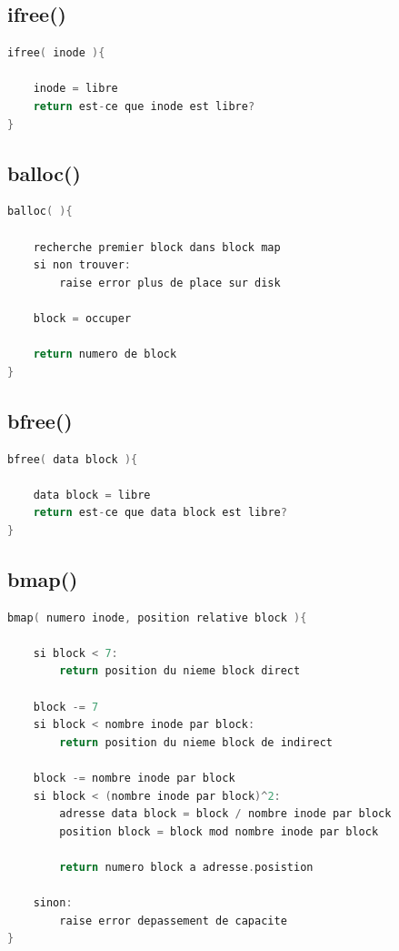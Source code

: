 \documentclass[a4paper,12pt]{article}
\begin{document}
\subsection{ifree()}

\begin{lstlisting}[language=C, caption=pseudo code ifree()()]
ifree( inode ){

	inode = libre
	return est-ce que inode est libre?
}
\end{lstlisting}

\subsection{balloc()}

\begin{lstlisting}[language=C, caption=pseudo code balloc()()]
balloc( ){

	recherche premier block dans block map
	si non trouver:
		raise error plus de place sur disk
	
	block = occuper

	return numero de block
}
\end{lstlisting}

\subsection{bfree()}

\begin{lstlisting}[language=C, caption=pseudo code bfree()()]
bfree( data block ){

	data block = libre
	return est-ce que data block est libre?
}
\end{lstlisting}

\subsection{bmap()}

\begin{lstlisting}[language=C, caption=pseudo code bmap()()]
bmap( numero inode, position relative block ){

	si block < 7:
		return position du nieme block direct
		
	block -= 7
	si block < nombre inode par block:
		return position du nieme block de indirect
	
	block -= nombre inode par block
	si block < (nombre inode par block)^2:
		adresse	data block = block / nombre inode par block
		position block = block mod nombre inode par block
		
		return numero block a adresse.posistion
		
	sinon:
		raise error depassement de capacite
}
\end{lstlisting}
\end{document}

